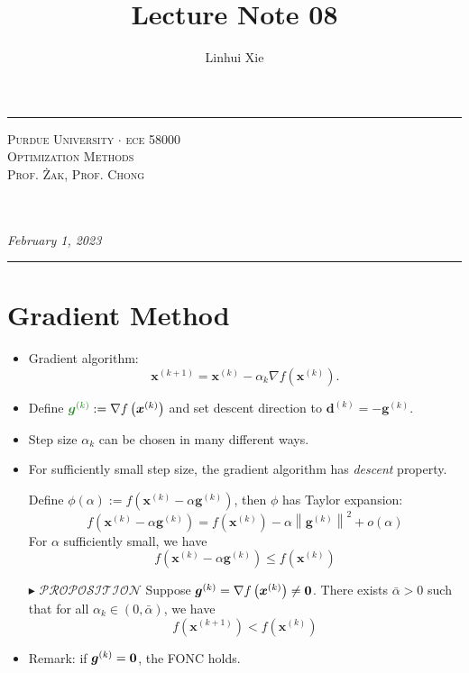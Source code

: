 \documentclass[12pt,thmsa]{article}
\author{Linhui Xie}
\title{Lecture Note 08}
\makeatletter
\def\maketitle{%
	\par
	\hrule height 1.5pt\vspace{1ex}
	\par\noindent
	
	\begin{minipage}{0.5\textwidth}
		\scshape
		Purdue University $\cdot$ ece 58000 \\[1ex]
		Optimization Methods \\
		Prof. Żak, Prof. Chong
	\end{minipage}
	\begin{minipage}{0.45\textwidth}
		\raggedleft
		\MakeTextUppercase{{\@title}}\\[0.3ex] %
		\textit{\@author}\\[0.2ex]
		\textit{February 1, 2023}
	\end{minipage}
	\par\vspace{1ex}
	\hrule height 1.5pt\vspace{1ex}
	\par
}
\makeatother
\begin{document}
\maketitle

\setcounter{section}{7}
\section{Gradient Method\medskip}
\setcounter{section}{8}

\begin{itemize}
	\item Gradient algorithm:
	\[
	\boldsymbol{x}^{(k+1)}=\boldsymbol{x}^{(k)}-\alpha_{k} \nabla f\left(\boldsymbol{x}^{(k)}\right) .
	\]
	
	\item Define \( {\color{forestgreen}\boldsymbol{g}^{(k)} }:=\nabla f\left(\boldsymbol{x}^{(k)}\right)\) and  set descent direction to \(\boldsymbol{d}^{(k)}=-\boldsymbol{g}^{(k)}\).

	\item Step size \(\alpha_{k}\) can be chosen in many different ways.
	
	\item For sufficiently small step size, the gradient algorithm has \textit{descent} property.
	
	Define \(\phi(\alpha):=f\left(\boldsymbol{x}^{(k)}-\alpha \boldsymbol{g}^{(k)}\right)\), then \(\phi\) has Taylor expansion:
	\[
	f\left(\boldsymbol{x}^{(k)}-\alpha \boldsymbol{g}^{(k)}\right)=f\left(\boldsymbol{x}^{(k)}\right)-\alpha\left\|\boldsymbol{g}^{(k)}\right\|^2+o(\alpha)
	\]
	For \(\alpha\) sufficiently small, we have
	\[
	f\left(\boldsymbol{x}^{(k)}-\alpha \boldsymbol{g}^{(k)}\right) \leq f\left(\boldsymbol{x}^{(k)}\right)
	\]
	
	\item[\(\blacktriangleright\)] \(\mathscr{PROPOSITION}\) Suppose \( { \color{black}\boldsymbol{g}^{(k)} }=\nabla f\left(\boldsymbol{x}^{(k)}\right) \neq \mathbf{0}\). There exists \(\bar{\alpha}>0\) such that for all \(\alpha_{k} \in(0, \bar{\alpha})\), we have
	\[
		f\left(\boldsymbol{x}^{(k+1)}\right)<f\left(\boldsymbol{x}^{(k)}\right)
	\]

	\item Remark: if \( { \color{black}\boldsymbol{g}^{(k)} }=\mathbf{0}\), the FONC holds. 
	

\end{itemize}
\end{document}

